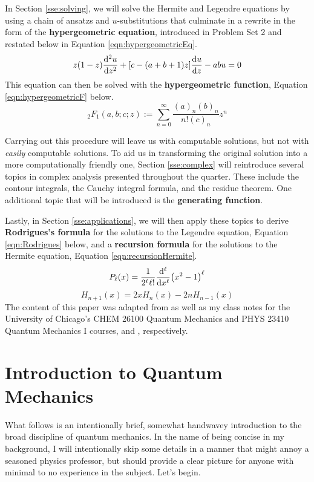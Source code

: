 \documentclass[titlepage]{article}
\numberwithin{equation}{section}
\begin{document}
In Section \ref{sse:solving}, we will solve the Hermite and Legendre equations by using a chain of ansatzs and $u$-substitutions that culminate in a rewrite in the form of the \textbf{hypergeometric equation}, introduced in Problem Set 2 and restated below in Equation \ref{eqn:hypergeometricEq}.
\begin{equation}\label{eqn:hypergeometricEq}
    z(1-z)\dv[2]{u}{z}+[c-(a+b+1)z]\dv{u}{z}-abu = 0
\end{equation}
This equation can then be solved with the \textbf{hypergeometric function}, Equation \ref{eqn:hypergeometricF} below.
\begin{equation}\label{eqn:hypergeometricF}
    {}_2F_1(a,b;c;z) := \sum_{n=0}^\infty\frac{(a)_n(b)_n}{n!(c)_n}z^n
\end{equation}\par
Carrying out this procedure will leave us with computable solutions, but not with \emph{easily} computable solutions. To aid us in transforming the original solution into a more computationally friendly one, Section \ref{sse:complex} will reintroduce several topics in complex analysis presented throughout the quarter. These include the contour integrals, the Cauchy integral formula, and the residue theorem. One additional topic that will be introduced is the \textbf{generating function}.\par
Lastly, in Section \ref{sse:applications}, we will then apply these topics to derive \textbf{Rodrigues's formula} for the solutions to the Legendre equation, Equation \ref{eqn:Rodrigues} below, and a \textbf{recursion formula} for the solutions to the Hermite equation, Equation \ref{eqn:recursionHermite}.
\begin{equation}\label{eqn:Rodrigues}
    P_\ell(x) = \frac{1}{2^\ell\ell!}\dv[\ell]{x}(x^2-1)^\ell
\end{equation}
\begin{equation}\label{eqn:recursionHermite}
    H_{n+1}(x) = 2xH_n(x)-2nH_{n-1}(x)
\end{equation}
The content of this paper was adapted from \textcite{bib:Seaborn} as well as my class notes for the University of Chicago's CHEM 26100 Quantum Mechanics and PHYS 23410 Quantum Mechanics I courses, \textcite{bib:CHEM26100Notes} and \textcite{bib:PHYS23410Notes}, respectively.
\newpage



\renewcommand{\leftmark}{\firstmark}
\renewcommand{\sectionmark}[1]{\markboth{Section \thesection\ (#1)}{}}
\renewcommand{\subsectionmark}[1]{}
\section{Introduction to Quantum Mechanics}\label{sse:qmech}
What follows is an intentionally brief, somewhat handwavey introduction to the broad discipline of quantum mechanics. In the name of being concise in my background, I will intentionally skip some details in a manner that might annoy a seasoned physics professor, but should provide a clear picture for anyone with minimal to no experience in the subject. Let's begin.
\end{document}
